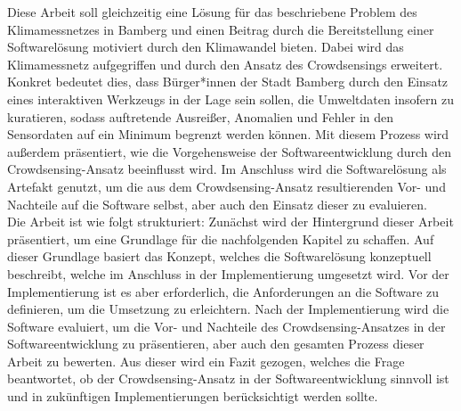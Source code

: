Diese Arbeit soll gleichzeitig eine Lösung für das beschriebene Problem des Klimamessnetzes in Bamberg und einen Beitrag durch die Bereitstellung einer Softwarelösung motiviert durch den Klimawandel bieten. Dabei wird das Klimamessnetz aufgegriffen und durch den Ansatz des Crowdsensings erweitert. Konkret bedeutet dies, dass Bürger*innen der Stadt Bamberg durch den Einsatz eines interaktiven Werkzeugs in der Lage sein sollen, die Umweltdaten insofern zu kuratieren, sodass auftretende Ausreißer, Anomalien und Fehler in den Sensordaten auf ein Minimum begrenzt werden können. Mit diesem Prozess wird außerdem präsentiert, wie die Vorgehensweise der Softwareentwicklung durch den Crowdsensing-Ansatz beeinflusst wird. Im Anschluss wird die Softwarelösung als Artefakt genutzt, um die aus dem Crowdsensing-Ansatz resultierenden Vor- und Nachteile auf die Software selbst, aber auch den Einsatz dieser zu evaluieren. \\ Die Arbeit ist wie folgt strukturiert: Zunächst wird der Hintergrund dieser Arbeit präsentiert, um eine Grundlage für die nachfolgenden Kapitel zu schaffen. Auf dieser Grundlage basiert das Konzept, welches die Softwarelösung konzeptuell beschreibt, welche im Anschluss in der Implementierung umgesetzt wird. Vor der Implementierung ist es aber erforderlich, die Anforderungen an die Software zu definieren, um die Umsetzung zu erleichtern. Nach der Implementierung wird die Software evaluiert, um die Vor- und Nachteile des Crowdsensing-Ansatzes in der Softwareentwicklung zu präsentieren, aber auch den gesamten Prozess dieser Arbeit zu bewerten. Aus dieser wird ein Fazit gezogen, welches die Frage beantwortet, ob der Crowdsensing-Ansatz in der Softwareentwicklung sinnvoll ist und in zukünftigen Implementierungen berücksichtigt werden sollte. 